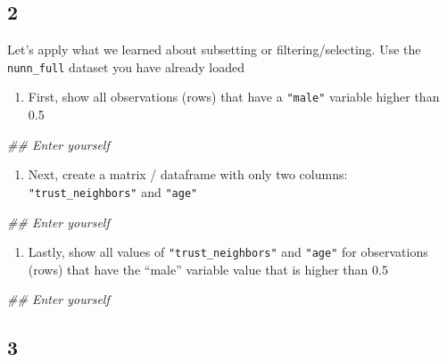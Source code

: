 \documentclass[
]{book}
\newenvironment{Shaded}{\begin{snugshade}}{\end{snugshade}}
\newcommand{\CommentTok}[1]{\textcolor[rgb]{0.56,0.35,0.01}{\textit{#1}}}
\providecommand{\tightlist}{%
  \setlength{\itemsep}{0pt}\setlength{\parskip}{0pt}}
\theoremstyle{definition}
\theoremstyle{definition}
\theoremstyle{definition}
\theoremstyle{definition}
\theoremstyle{remark}
\begin{document}
\hypertarget{section-7}{%
\subsection*{2}\label{section-7}}

Let's apply what we learned about subsetting or filtering/selecting. Use the \texttt{nunn\_full} dataset you have already loaded

\begin{enumerate}
\def\labelenumi{\alph{enumi})}
\tightlist
\item
  First, show all observations (rows) that have a \texttt{"male"} variable higher than 0.5
\end{enumerate}

\begin{Shaded}
\begin{Highlighting}[]
\CommentTok{## Enter yourself}
\end{Highlighting}
\end{Shaded}

\begin{enumerate}
\def\labelenumi{\alph{enumi})}
\setcounter{enumi}{1}
\tightlist
\item
  Next, create a matrix / dataframe with only two columns: \texttt{"trust\_neighbors"} and \texttt{"age"}
\end{enumerate}

\begin{Shaded}
\begin{Highlighting}[]
\CommentTok{## Enter yourself}
\end{Highlighting}
\end{Shaded}

\begin{enumerate}
\def\labelenumi{\alph{enumi})}
\setcounter{enumi}{2}
\tightlist
\item
  Lastly, show all values of \texttt{"trust\_neighbors"} and \texttt{"age"} for observations (rows) that have the ``male'' variable value that is higher than 0.5
\end{enumerate}

\begin{Shaded}
\begin{Highlighting}[]
\CommentTok{## Enter yourself}
\end{Highlighting}
\end{Shaded}

\hypertarget{section-8}{%
\subsection*{3}\label{section-8}}
\end{document}
